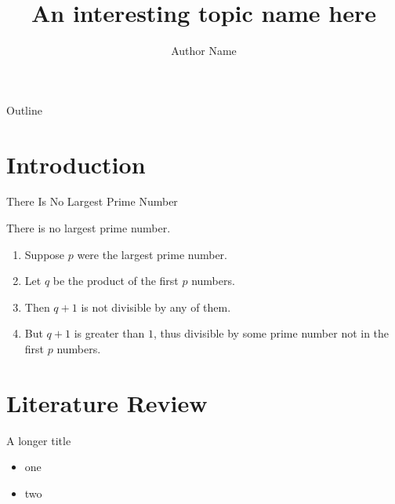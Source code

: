 \documentclass{beamer}
\title{An interesting topic name here}
\author{Author Name}
\institute{Department of Economics}
\begin{document}
\begin{frame}
	\titlepage
\end{frame}

	
\begin{frame}{Outline}
	\tableofcontents
\end{frame}

\section{Introduction}	%

\begin{frame}{There Is No Largest Prime Number} 
	\begin{theorem}
		There is no largest prime number.
	\end{theorem} 
	\begin{enumerate} 
		\item Suppose $p$ were the largest prime number. 
		\item Let $q$ be the product of the first $p$ numbers. 
		\item Then $q+1$ is not divisible by any of them. 
		\item But $q + 1$ is greater than $1$, thus divisible by some prime
		number not in the first $p$ numbers.
	\end{enumerate}
\end{frame}

\section{Literature Review}		
\begin{frame}{A longer title}
	\begin{itemize}
		\item one
		\item two
	\end{itemize}
\end{frame}
\end{document}
